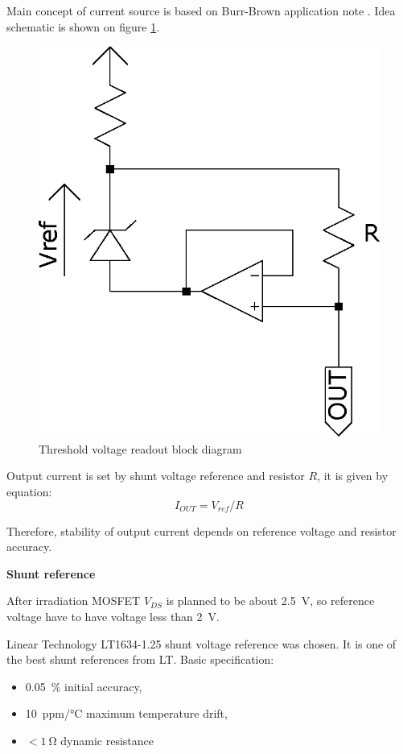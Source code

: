         Main concept of current source is based on Burr-Brown application note \cite{Make_a_precision_current_source_or_sink}. Idea schematic is shown on figure \ref{current_source_schematic}.

        \begin{figure}[H]
            \centering
            \includegraphics[width=0.3\paperwidth]{img/06/current_source_schematic.eps}
            \caption{Threshold voltage readout block diagram}
            \label{current_source_schematic}
        \end{figure}

        Output current is set by shunt voltage reference and resistor $R$, it is given by equation:
        $$I_{OUT} = V_{ref}/R$$

        Therefore, stability of output current depends on reference voltage and resistor accuracy.

        \bigskip \textbf{Shunt reference}

        After irradiation MOSFET $V_{DS}$ is planned to be about \SI{2.5}{\volt}, so reference voltage have to have voltage less than \SI{2}{\volt}.

        Linear Technology LT1634-1.25 shunt voltage reference was chosen. It is one of the best shunt references from LT. Basic specification:
        \begin{itemize}
            \item \SI{0.05}{\percent} initial accuracy,
            \item \SI{10}{ppm/\degreeCelsius} maximum temperature drift,
            \item $< \SI{1}{\ohm}$ dynamic resistance
        \end{itemize}

